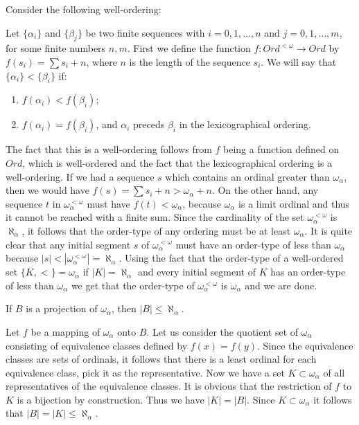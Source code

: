 \begin{solution}
  Consider the following well-ordering:

  Let $\{\alpha_i\}$ and $\{\beta_j\}$ be two finite sequences with $i = 0, 1, \ldots, n$ and $j = 0, 1, \ldots, m$, for some finite numbers $n, m$.
  First we define the function $f : Ord^{<\omega} \to Ord$ by $f(s_i) = \sum s_i + n$, where $n$ is the length of the sequence $s_i$.
  We will say that $\{\alpha_i\} < \{\beta_i\}$ if:
  \begin{enumerate}[label=(\alph*)]
    \item $f(\alpha_i) < f(\beta_i)$;
    \item $f(\alpha_i) = f(\beta_i)$, and $\alpha_i$ preceds $\beta_i$ in the lexicographical ordering.
  \end{enumerate}

  The fact that this is a well-ordering follows from $f$ being a function defined on $Ord$, which is well-ordered and the fact that the lexicographical ordering is a well-ordering.
  If we had a sequence $s$ which contains an ordinal greater than $\omega_{\alpha}$, then we would have $f(s) = \sum s_i + n > \omega_{\alpha} + n$.
  On the other hand, any sequence $t$ in $\omega_{\alpha}^{<\omega}$ must have $f(t) < \omega_{\alpha}$, because $\omega_{\alpha}$ is a limit ordinal and thus it cannot be reached with a finite sum.
  Since the cardinality of the set $\omega_{\alpha}^{<\omega}$ is $\aleph_{\alpha}$, it follows that the order-type of any ordering must be at least $\omega_{\alpha}$.
  It is quite clear that any initial segment $s$ of $\omega_{\alpha}^{<\omega}$ must have an order-type of less than $\omega_{\alpha}$ because $|s| < |\omega_{\alpha}^{<\omega}| = \aleph_{\alpha}$.
  Using the fact that the order-type of a well-ordered set $\{K, <\} = \omega_{\alpha}$ if $|K| = \aleph_{\alpha}$ and every initial segment of $K$ has an order-type of less than $\omega_{\alpha}$ we get that the order-type of $\omega_{\alpha}^{<\omega}$ is $\omega_{\alpha}$ and we are done.
\end{solution}

\begin{problem}
  If $B$ is a projection of $\omega_{\alpha}$, then $|B| \le \aleph_{\alpha}$.
\end{problem}

\begin{solution}
  Let $f$ be a mapping of $\omega_{\alpha}$ onto $B$.
  Let us consider the quotient set of $\omega_{\alpha}$ consisting of equivalence classes defined by $f(x) = f(y)$.
  Since the equivalence classes are sets of ordinals, it follows that there is a least ordinal for each equivalence class, pick it as the representative.
  Now we have a set $K \subset \omega_{\alpha}$ of all representatives of the equivalence classes.
  It is obvious that the restriction of $f$ to $K$ is a bijection by construction.
  Thus we have $|K| = |B|$.
  Since $K \subset \omega_{\alpha}$ it follows that $|B| = |K| \le \aleph_{\alpha}$.
\end{solution}

